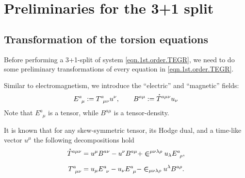 \documentclass[
10pt, %
a4paper, %
oneside, %
twocolumn,
headinclude,footinclude, %
BCOR5mm, %
]{scrartcl}
\newcommand{\Tors}[2]{T^{#1}_{\phantom{#1}#2}}
\newcommand{\ET}[2]{E^{#1}_{\phantom{#1}#2}}	%
\newcommand{\BT}[2]{B^{#1#2}}	%
\newcommand{\LCsymb}{\bm{\in}}    %
\newcommand{\HDT}[1]{\accentset{\star}{T}^{#1}}
\begin{document}
	\section{Preliminaries for the 3+1 split}\label{sec.31.prep}
	
	
	
	\subsection{Transformation of the torsion equations}\label{sec.transform.potential}
	
	
	Before performing a 3+1-split \cite{Alcubierre2008} of system \eqref{eqn.1st.order.TEGR}, 
	we 
	need to do some preliminary transformations of every equation in \eqref{eqn.1st.order.TEGR}. 
	
	
	Similar to electromagnetism, we introduce the ``electric'' and ``magnetic''
	fields:
	\begin{equation}
		\ET{a}{\mu} := \Tors{a}{\mu\nu} u^\nu, \qquad  \BT{a}{\mu} := \HDT{a\mu\nu} u_\nu
	\end{equation}
	Note that $ \ET{a}{\mu} $ is a tensor, while $ \BT{a}{\mu}
	$ is a tensor-density.
	
	It is known that for any skew-symmetric tensor, its Hodge dual, and a time-like vector $ u^\mu 
	$ 
	the following 
	decompositions hold
	\begin{subequations}\label{eqn.T.decompos}
		\begin{align}
			\HDT{a\mu\nu} &= u^\mu \BT{a}{\nu} - u^\nu \BT{a}{\mu} + 
			\LCsymb^{\mu\nu\lambda\rho}u_\lambda 
			\ET{a}{\rho},\\[2mm]
			\Tors{a}{\mu\nu} &= u_\mu \ET{a}{\nu} - u_\nu \ET{a}{\mu} - 
			\LCsymb_{\mu\nu\lambda\rho}u^\lambda 
			\BT{a}{\rho}.
		\end{align}
	\end{subequations}
	
\end{document}
